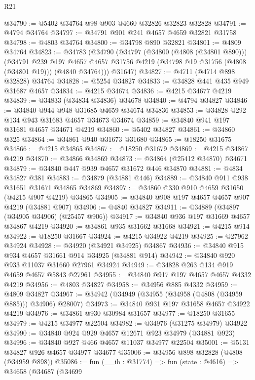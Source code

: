 \begin{lexlean}{R21}
\begin{coremodule}
@34790 := @5402 @34764 @98 @903 @4660 @32826 @32823 @32828
@34791 := @4794 @34764
@34797 := @34791 @901 @241 @4657 @4659 @32821 @31758
@34798 := @4803 @34764
@34800 := @34798 @890 @32821
@34801 := @4809 @34764
@34823 := @34783
    (@34790
      (@34797
        (@34800 (@4808 (@34801 @890)))
        (@34791
          @239
          @197
          @4657
          @4657
          @31756
          @4219
          (@34798 @19 @31756 (@4808 (@34801 @19)))
          (@4840 @34764)))
      @31647)
@34827 := @4711 (@4714 @898 @32828) @34764
@34828 := @5254 @34827
@34833 := @34828 @441 @435 @949 @31687 @4657
@34834 := @4215 @34674
@34836 := @4215 @34677 @4219
@34839 := @34833 (@34834 @34836) @34678
@34840 := @4794 @34827
@34846 := @34840 @944 @948 @31685 @4659 @34674 @34836
@34853 := @34828 @292 @134 @943 @31683 @4657 @34673 @34674
@34859 := @34840 @941 @197 @31681 @4657 @34671 @4219
@34860 := @5402 @34827
@34861 := @34860 @325
@34864 := @34861 @940 @31673 @31680
@34865 := @18250 @31675
@34866 := @4215 @34865
@34867 := @18250 @31679
@34869 := @4215 @34867 @4219
@34870 := @34866 @34869
@34873 := @34864 (@25412 @34870) @34671
@34879 := @34840 @447 @939 @4657 @31672 @446 @34870
@34881 := @4834 @34827 @381
@34883 := @34879 (@34881 @446)
@34889 := @34840 @911 @938 @31651 @31671 @34865 @34869
@34897 := @34860 @330 @910 @4659 @31650 (@4215 @907 @4219) @34865
@34905 := @34840 @908 @197 @4657 @4657 @907 @4219 (@34881 @907)
@34906 := @4840 @34827
@34911 := @34889 (@34897 (@34905 @34906) (@25457 @906))
@34917 := @34840 @936 @197 @31669 @4657 @34867 @4219
@34920 := @34861 @935 @31662 @31668
@34921 := @4215 @914
@34922 := @18250 @31667
@34924 := @4215 @34922 @4219
@34925 := @27962 @34924
@34928 := @34920 (@34921 @34925) @34867
@34936 := @34840 @915 @934 @4657 @31661 @914 @34925 (@34881 @914)
@34942 := @34840 @920 @933 @11037 @31660 @27961 @34924
@34949 := @34828 @263 @134 @919 @4659 @4657 @5843 @27961
@34955 := @34840 @917 @197 @4657 @4657 @4332 @4219
@34956 := @4803 @34827
@34958 := @34956 @885 @4332
@34959 := @4809 @34827
@34967 := @34942 (@34949 (@34955 (@34958 (@4808 (@34959 @885))) @34906) @28007)
@34973 := @34840 @931 @197 @31658 @4657 @34922 @4219
@34976 := @34861 @930 @30984 @31657
@34977 := @18250 @31655
@34979 := @4215 @34977 @22504
@34982 := @34976 (@31275 @34979) @34922
@34990 := @34840 @924 @929 @4657 @12671 @923 @34979 (@34881 @923)
@34996 := @34840 @927 @466 @4657 @11037 @34977 @22504
@35001 := @5131 @34827 @926 @4657 @34977 @34677
@35006 := @34956 @898 @32828 (@4808 (@34959 @898))
@35086 := fun (__ih : @31774) =>
  fun (state : @4616) =>
  @34658
    (@34687
      (@34699

\end{coremodule}
\end{lexlean}

